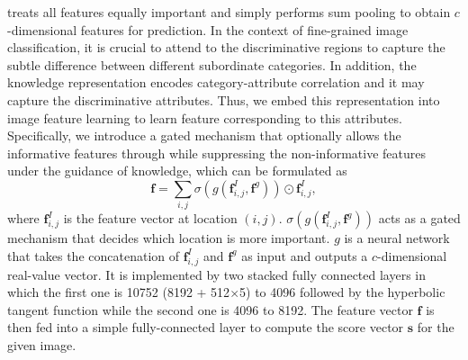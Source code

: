 \documentclass{article}
\begin{document}
\cite{gao2016compact} treats all features equally important and simply performs sum pooling to obtain $c$-dimensional features for prediction. In the context of fine-grained image classification, it is crucial to attend to the discriminative regions to capture the subtle difference between different subordinate categories. In addition, the knowledge representation encodes category-attribute correlation and it may capture the discriminative attributes. Thus, we embed this representation into image feature learning to learn feature corresponding to this attributes. Specifically, we introduce a gated mechanism that optionally allows the informative features through while suppressing the non-informative features under the guidance of knowledge, which can be formulated as
\begin{equation}
    \mathbf{f}=\sum_{i,j}\sigma\left(g\left(\mathbf{f}_{i,j}^I, \mathbf{f}^g\right)\right)\odot \mathbf{f}_{i,j}^I,
\end{equation}
where $\mathbf{f}_{i,j}^I$ is the feature vector at location $(i,j)$. $\sigma\left(g\left(\mathbf{f}_{i,j}^I, \mathbf{f}^g\right)\right)$ acts as a gated mechanism that decides which location is more important. $g$ is a neural network that takes the concatenation of $\mathbf{f}_{i,j}^I$ and $\mathbf{f}^g$ as input and outputs a $c$-dimensional real-value vector. It is implemented by two stacked fully connected layers in which the first one is 10752 (8192 + 512$\times$5) to 4096 followed by the hyperbolic tangent function while the second one is 4096 to 8192. The feature vector $\mathbf{f}$ is then fed into a simple fully-connected layer to compute the score vector $\mathbf{s}$ for the given image. 
\end{document}

